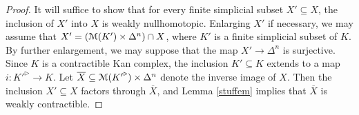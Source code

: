 \begin{proof}
It will suffice to show that for every finite simplicial subset $X' \subseteq X$, the inclusion of $X'$ into $X$ is weakly nullhomotopic. Enlarging $X'$ if necessary, we may assume that
$X' = (\operatorname{{\mathcal M}}(K') \times \Delta^n) \cap X$, where $K'$ is a finite simplicial subset of $K$. By further enlargement, we may suppose that the map $X' \rightarrow \Delta^n$ is surjective. Since $K$ is a contractible Kan complex, the inclusion $K' \subseteq K$ extends to a map $i: {K'}^{\triangleright} \rightarrow K$. Let $\overline{X} \subseteq \operatorname{{\mathcal M}}( {K'}^{\triangleright} ) \times \Delta^n$ denote
the inverse image of $X$. Then the inclusion $X' \subseteq X$ factors through $\overline{X}$, and Lemma \ref{stuffem} implies that $\overline{X}$ is weakly contractible.
\end{proof}

